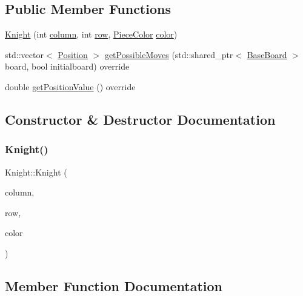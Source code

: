 \subsection*{Public Member Functions}
\begin{DoxyCompactItemize}
\item 
\hyperlink{class_knight_aa418acf5ad780d161e472480b5919b9e}{Knight} (int \hyperlink{class_piece_aa8f39e11280395103164f6ae07398c82}{column}, int \hyperlink{class_piece_ac6ef7c474f20562cb629c2452ce0631d}{row}, \hyperlink{_piece_8h_ad7595c48bb74c0dd2a7648712a2d4985}{Piece\+Color} \hyperlink{class_piece_a8dfe0501fe95a1a7618cf5ad3b9fda69}{color})
\item 
std\+::vector$<$ \hyperlink{struct_position}{Position} $>$ \hyperlink{class_knight_a1b8ea442283ed12951dfb67d7382221d}{get\+Possible\+Moves} (std\+::shared\+\_\+ptr$<$ \hyperlink{class_base_board}{Base\+Board} $>$ board, bool initialboard) override
\item 
double \hyperlink{class_knight_aa5116e2b3cbbb576283015565b6261a1}{get\+Position\+Value} () override
\end{DoxyCompactItemize}


\subsection{Constructor \& Destructor Documentation}
\mbox{\label{class_knight_aa418acf5ad780d161e472480b5919b9e}} 
\subsubsection{\texorpdfstring{Knight()}{Knight()}}
{\footnotesize\ttfamily Knight\+::\+Knight (\begin{DoxyParamCaption}\item[{int}]{column,  }\item[{int}]{row,  }\item[{\hyperlink{_piece_8h_ad7595c48bb74c0dd2a7648712a2d4985}{Piece\+Color}}]{color }\end{DoxyParamCaption})\hspace{0.3cm}{\ttfamily [inline]}}



\subsection{Member Function Documentation}
\mbox{\label{class_knight_aa5116e2b3cbbb576283015565b6261a1}} 
